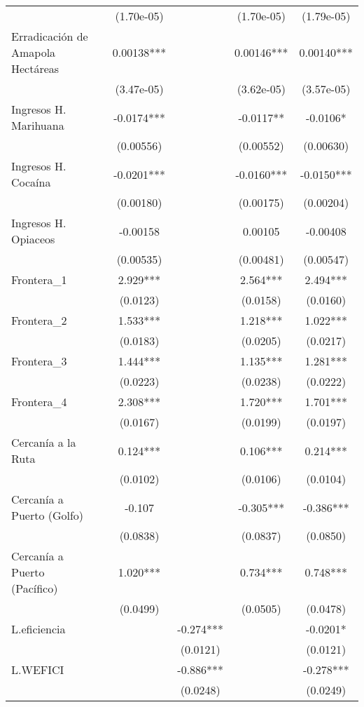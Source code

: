 {\begin{tabular}{lccccc}
 &  & (1.70e-05) &  & (1.70e-05) & (1.79e-05) \\
\rowcolor{Blue}Erradicación de Amapola Hectáreas &  & 0.00138*** &  & 0.00146*** & 0.00140*** \\
 &  & (3.47e-05) &  & (3.62e-05) & (3.57e-05) \\
\rowcolor{Blue}Ingresos H. Marihuana &  & -0.0174*** &  & -0.0117** & -0.0106* \\
 &  & (0.00556) &  & (0.00552) & (0.00630) \\
\rowcolor{Blue}Ingresos H. Cocaína &  & -0.0201*** &  & -0.0160*** & -0.0150*** \\
 &  & (0.00180) &  & (0.00175) & (0.00204) \\
\rowcolor{Blue}Ingresos H. Opiaceos &  & -0.00158 &  & 0.00105 & -0.00408 \\
 &  & (0.00535) &  & (0.00481) & (0.00547) \\
\rowcolor{Blue}Frontera_1 &  & 2.929*** &  & 2.564*** & 2.494*** \\
 &  & (0.0123) &  & (0.0158) & (0.0160) \\
\rowcolor{Blue}Frontera_2 &  & 1.533*** &  & 1.218*** & 1.022*** \\
 &  & (0.0183) &  & (0.0205) & (0.0217) \\
\rowcolor{Blue}Frontera_3 &  & 1.444*** &  & 1.135*** & 1.281*** \\
 &  & (0.0223) &  & (0.0238) & (0.0222) \\
\rowcolor{Blue}Frontera_4 &  & 2.308*** &  & 1.720*** & 1.701*** \\
 &  & (0.0167) &  & (0.0199) & (0.0197) \\
\rowcolor{Blue}Cercanía a la Ruta &  & 0.124*** &  & 0.106*** & 0.214*** \\
 &  & (0.0102) &  & (0.0106) & (0.0104) \\
\rowcolor{Blue}Cercanía a Puerto (Golfo) &  & -0.107 &  & -0.305*** & -0.386*** \\
 &  & (0.0838) &  & (0.0837) & (0.0850) \\
\rowcolor{Blue}Cercanía a Puerto (Pacífico) &  & 1.020*** &  & 0.734*** & 0.748*** \\
 &  & (0.0499) &  & (0.0505) & (0.0478) \\
\rowcolor{Red}L.eficiencia &  &  & -0.274*** &  & -0.0201* \\
 &  &  & (0.0121) &  & (0.0121) \\
\rowcolor{Red}L.WEFICI &  &  & -0.886*** &  & -0.278*** \\
 &  &  & (0.0248) &  & (0.0249) \\

\end{tabular}}
